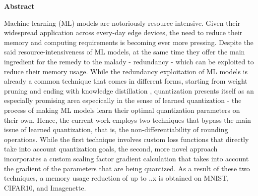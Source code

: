 \thispagestyle{empty}
\vspace*{1.0cm}

\begin{center}
    \textbf{Abstract} \label{abstract}
\end{center}

\vspace*{0.5cm}

\noindent Machine learning (ML) models are notoriously resource-intensive.
Given their widespread application across every-day edge devices,
the need to reduce their memory and computing requirements is becoming ever more pressing.
Despite the said resource-intensiveness of ML models, at the same time 
they offer the main ingredient for the remedy to the malady - redundancy - 
which can be exploited to reduce their memory usage.
While the redundancy exploitation of ML models is already a common 
technique that comes in different forms, starting from weight pruning  \cite{DBLP:conf/nips/CunDS89} \cite{DBLP:conf/iclr/MolchanovTKAK17}\cite{han2016deepcompression} and
ending with knowledge distillation \cite{DBLP:journals/corr/HintonVD15} \cite{DBLP:conf/icmlt/OkadoMIKS22}, quantization presents itself as an especially promising 
area especically in the sense of learned quantization - 
the process of making ML models learn their optimal quantization parameters
on their own.
Hence, the current work employs two techniques that bypass the main issue of learned quantization,
that is, the non-differentiability of rounding operations.
While the first technique involves custom loss functions that directly take into account
quantization goals, the second, more novel approach incorporates a custom scaling factor gradient calculation that takes into account 
the gradient of the parameters that are being quantized.
As a result of these two techniques, a memory usage reduction of up to ..x is obtained 
on MNIST, CIFAR10, and Imagenette. 